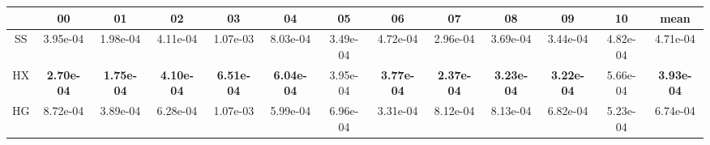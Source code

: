 \begin{tabular}{|c|c|c|c|c|c|c|c|c|c|c|c|c|}
\hline
 & 00 & 01 & 02 & 03 & 04 & 05 & 06 & 07 & 08 & 09 & 10 & mean \\
\hline
SS & 3.95e-04 & 1.98e-04 & 4.11e-04 & 1.07e-03 & 8.03e-04 & 3.49e-04 & 4.72e-04 & 2.96e-04 & 3.69e-04 & 3.44e-04 & 4.82e-04 & 4.71e-04 \\
\hline
HX & \textbf{2.70e-04} & \textbf{1.75e-04} & \textbf{4.10e-04} & \textbf{6.51e-04} & \textbf{6.04e-04} & 3.95e-04 & \textbf{3.77e-04} & \textbf{2.37e-04} & \textbf{3.23e-04} & \textbf{3.22e-04} & 5.66e-04 & \textbf{3.93e-04} \\
\hline
HG & 8.72e-04 & 3.89e-04 & 6.28e-04 & 1.07e-03 & 5.99e-04 & 6.96e-04 & 3.31e-04 & 8.12e-04 & 8.13e-04 & 6.82e-04 & 5.23e-04 & 6.74e-04 \\

\hline
\end{tabular}
